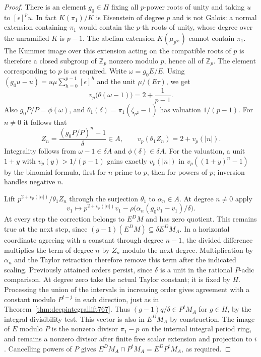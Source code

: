 \documentclass[a4paper,11pt]{article}
\theoremstyle{definition}
\theoremstyle{remark}
\newcommand{\ZZ}{\mathbb Z}\newcommand{\ord}{\operatorname{ord}}
\numberwithin{equation}{section}
\begin{document}
\begin{proof}
There is an element \(g_0\in H\) fixing all \(p\)-power
roots of unity and taking \(u\) to \([\epsilon]^p u\).
In fact \(K(\pi_1)/K\) is Eisenstein of degree \(p\)
and is not Galois: a normal extension containing \(\pi_1\)
would contain the \(p\)-th roots of unity, whose degree
over the unramified \(K\) is \(p-1\). The abelian extension
\(K(\mu_{p^\infty})\) cannot contain \(\pi_1\).
The Kummer image over this extension acting on the
compatible roots of \(p\) is therefore a closed subgroup
of \(\ZZ_p\) nonzero modulo \(p\), hence all of \(\ZZ_p\).
The element corresponding to \(p\) is as required.
Write \(\omega=g_0E/E\). Using
\((g_0u-u)=u\mu\sum_{h=0}^{p-1}[\epsilon]^h\)
and the unit \(\mu/(E\tau)\), we get
\[
        v_p\big(\theta(\omega-1)\big)
             =2+\frac1{p-1}.
\]
Also \(g_0P/P=\phi(\omega)\), and
\(\theta_1(\delta)=\pi_1(\zeta_{p^2}-1)\) has valuation
\(1/(p-1)\). For \(n\ne0\) it follows that
\[
 Z_n=\frac{(g_0P/P)^n-1}{\delta}\in A,\qquad
                v_p(\theta_1 Z_n)=2+v_p(|n|).
\]
Integrality follows from \(\omega-1\in\delta A\) and
\(\phi(\delta)\in\delta A\). For the valuation, a unit
\(1+y\) with \(v_p(y)>1/(p-1)\) gains exactly \(v_p(|n|)\)
in \(v_p((1+y)^n-1)\) by the binomial formula, first
for \(n\) prime to \(p\), then for powers of \(p\);
inversion handles negative \(n\).

Lift \(p^{2+v_p(|n|)}/\theta_1 Z_n\) through the
surjection \(\theta_1\) to \(\alpha_n\in A\). At degree
\(n\ne0\) apply
\[
       v_1\longmapsto p^{2+v_p(|n|)}v_1-
                   \rho\big(\alpha_n(g_0v_1-v_1)/\delta\big).
\]
At every step the correction belongs to \(E^D M\)
and has zero quotient. This remains true at the next step,
since \((g-1)(E^D M)\subseteq\delta E^D M_A\).
In a horizontal coordinate agreeing with a constant through
degree \(n-1\), the divided difference multiplies the term
of degree \(n\) by \(Z_n\) modulo the next degree.
Multiplication by \(\alpha_n\) and the Taylor retraction
therefore remove this term after the indicated scaling.
Previously attained orders persist, since \(\delta\) is a
unit in the rational \(P\)-adic comparison. At degree zero
take the actual Taylor constant; it is fixed by \(H\).
Processing the union of the intervals in increasing order
gives agreement with a constant modulo \(P^{t-j}\) in
each direction, just as in Theorem~\ref{thm:deepintegrallift767}.
Thus \((g-1)q/\delta\in P^t M_A\) for \(g\in H\), by
the integral divisibility test. This vector is also in
\(E^D M_A\) by construction. The image of \(E\) modulo
\(P\) is the nonzero divisor \(\pi_1-p\) on the internal
integral period ring, and remains a nonzero divisor after
finite free scalar extension and projection to \(i\).
Cancelling powers of \(P\) gives
\(E^D M_A\cap P^t M_A=E^D P^t M_A\), as required.
\end{proof}
\end{document}
